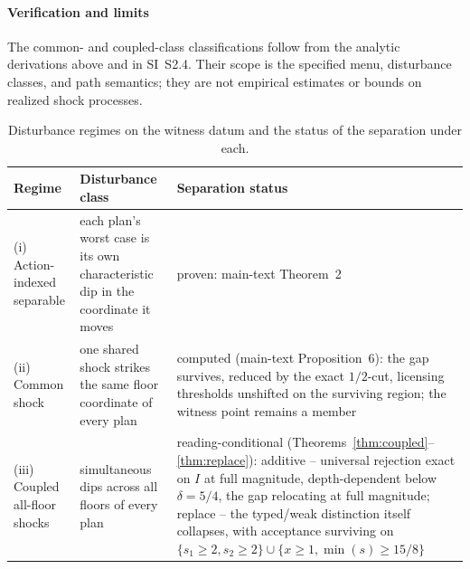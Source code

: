 \paragraph{Verification and limits} The common- and coupled-class classifications follow from the analytic derivations above and in SI~S2.4. Their scope is the specified menu, disturbance classes, and path semantics; they are not empirical estimates or bounds on realized shock processes.

\begin{table}[!htbp]
\centering\small
\caption{Disturbance regimes on the witness datum and the status of the separation under each.}
\label{tab:disturbance}
\begin{tabularx}{\textwidth}{@{}>{\raggedright\arraybackslash}p{}>{\raggedright\arraybackslash}p{}X@{}}
\toprule
Regime & Disturbance class & Separation status \\
\midrule
(i) Action-indexed separable & each plan's worst case is its own characteristic dip in the coordinate it moves & proven: main-text Theorem~2 \\
(ii) Common shock & one shared shock strikes the same floor coordinate of every plan & computed (main-text Proposition~6): the gap survives, reduced by the exact $1/2$-cut, licensing thresholds unshifted on the surviving region; the witness point remains a member \\
(iii) Coupled all-floor shocks & simultaneous dips across all floors of every plan & reading-conditional (Theorems~\ref{thm:coupled}--\ref{thm:replace}): additive -- universal rejection exact on $I$ at full magnitude, depth-dependent below $\delta=5/4$, the gap relocating at full magnitude; replace -- the typed/weak distinction itself collapses, with acceptance surviving on $\{s_1\ge2,s_2\ge2\}\cup\{x\ge1,\min(s)\ge15/8\}$ \\
\bottomrule
\end{tabularx}
\end{table}
